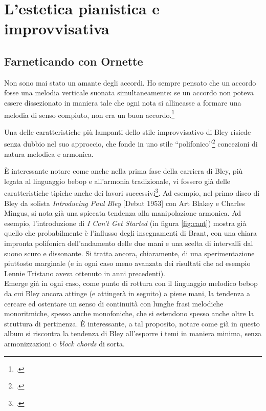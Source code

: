 \chapter{L'estetica pianistica e improvvisativa}
\section{Farneticando con Ornette}
\begin{fquote}
	Non sono mai stato un amante degli accordi. Ho sempre pensato che un accordo fosse una melodia verticale suonata simultaneamente: se un accordo non poteva essere dissezionato in maniera tale che ogni nota si allineasse a formare una melodia di senso compiuto, non era un buon accordo.\footcite[71]{stopping}
\end{fquote}
Una delle caratteristiche più lampanti dello stile improvvisativo di Bley risiede senza dubbio nel suo approccio, che fonde in uno stile ``polifonico''\footcite[50]{cappelletti} concezioni di natura melodica e armonica. \par
È interessante notare come anche nella prima fase della carriera di Bley, più legata al linguaggio bebop e all'armonia tradizionale, vi fossero già delle caratteristiche tipiche anche dei lavori successivi\footcite[104]{dean}. Ad esempio, nel primo disco di Bley da solista \textit{Introducing Paul Bley} [Debut 1953] con Art Blakey e Charles Mingus, si nota già una spiccata tendenza alla manipolazione armonica. Ad esempio, l'introduzione di \textit{I Can't Get Started} (in figura \ref{fig:cant}) mostra già quello che probabilmente è l'influsso degli insegnamenti di Brant, con una chiara impronta polifonica dell'andamento delle due mani e una scelta di intervalli dal suono scuro e dissonante.
Si tratta ancora, chiaramente, di una sperimentazione piuttosto marginale (e in ogni caso meno avanzata dei risultati che ad esempio Lennie Tristano aveva ottenuto in anni precedenti). \\
Emerge già in ogni caso, come punto di rottura con il linguaggio melodico bebop da cui Bley ancora attinge (e attingerà in seguito) a piene mani, la tendenza a cercare ed ostentare un senso di continuità con lunghe frasi melodiche monoritmiche, spesso anche monofoniche, che si estendono spesso anche oltre la struttura di pertinenza. È interessante, a tal proposito, notare come già in questo album si riscontra la tendenza di Bley all'esporre i temi in maniera minima, senza armonizzazioni o \textit{block chords} di sorta.
